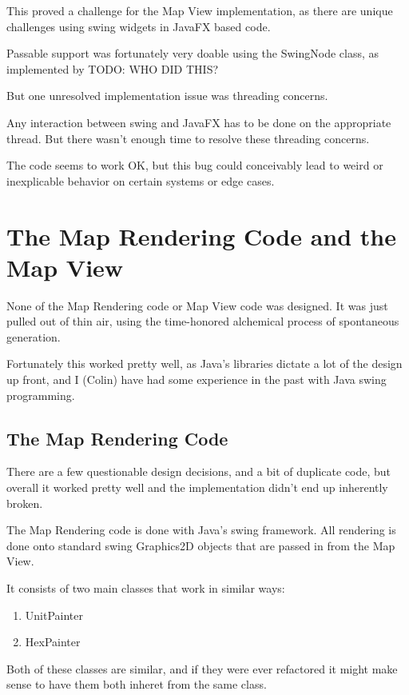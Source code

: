 \documentclass[12pt,a4paper]{article}
\begin{document}
This proved a challenge for the Map View implementation, as there are unique
challenges using swing widgets in JavaFX based code.

Passable support was fortunately very doable using the SwingNode class,
as implemented by TODO: WHO DID THIS?

But one unresolved implementation issue was threading concerns.

Any interaction between swing and JavaFX has to be done on the appropriate
thread. But there wasn't enough time to resolve these threading concerns.

The code seems to work OK, but this bug could conceivably lead to weird
or inexplicable behavior on certain systems or edge cases.

\section{The Map Rendering Code and the Map View}

None of the Map Rendering code or Map View code was designed.
It was just pulled out of thin air, using the time-honored alchemical process
of spontaneous generation.

Fortunately this worked pretty well, as Java's libraries dictate a lot
of the design up front, and I (Colin) have had some experience in the past
with Java swing programming.

\subsection{The Map Rendering Code}
There are a few questionable design decisions, and a bit of duplicate code,
but overall it worked pretty well and the implementation didn't end up
inherently broken.

The Map Rendering code is done with Java's swing framework. All rendering
is done onto standard swing Graphics2D objects that are passed in from the
Map View.

It consists of two main classes that work in similar ways:
\begin{enumerate}
\item{UnitPainter}
\item{HexPainter}
\end{enumerate}

Both of these classes are similar, and if they were ever refactored it might
make sense to have them both inheret from the same class.
\end{document}
